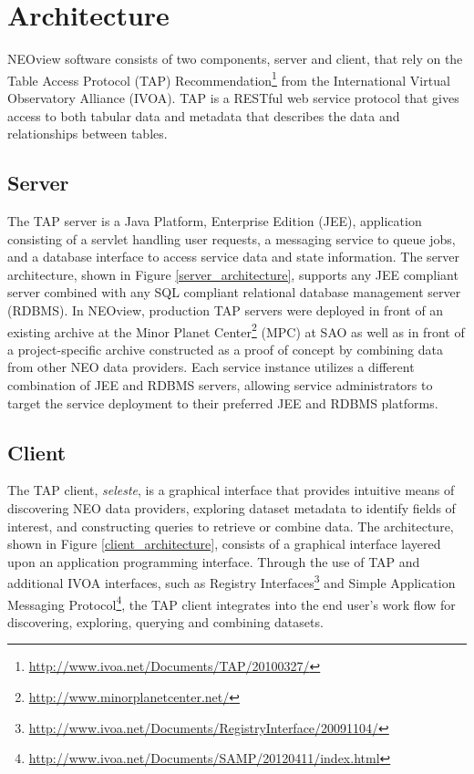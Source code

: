 \documentclass[11pt,twoside]{article}
\begin{document}
\section{Architecture}
NEOview software consists of two components, server and client, that rely on the Table Access Protocol (TAP) Recommendation\footnote{\url{http://www.ivoa.net/Documents/TAP/20100327/}} from the International Virtual Observatory Alliance (IVOA).  TAP is a RESTful web service protocol that gives access to both tabular data and metadata that describes the data and relationships between tables.

\subsection{Server}
The TAP server is a Java Platform, Enterprise Edition (JEE), application consisting of a servlet handling user requests, a messaging service to queue jobs, and a database interface to access service data and state information.  The server architecture, shown in Figure \ref{server_architecture}, supports any JEE compliant server combined with any SQL compliant relational database management server (RDBMS).  In NEOview, production TAP servers were deployed in front of an existing archive at the Minor Planet Center\footnote{\url{http://www.minorplanetcenter.net/}} (MPC) at SAO as well as in front of a project-specific archive constructed as a proof of concept by combining data from other NEO data providers.  Each service instance utilizes a different combination of JEE and RDBMS servers, allowing service administrators to target the service deployment to their preferred JEE and RDBMS platforms.


\subsection{Client}
The TAP client, \textit{seleste}, is a graphical interface that provides intuitive means of discovering NEO data providers, exploring dataset metadata to identify fields of interest, and constructing queries to retrieve or combine data.  The architecture, shown in Figure \ref{client_architecture}, consists of a graphical interface layered upon an application programming interface.  Through the use of TAP and additional IVOA interfaces, such as Registry Interfaces\footnote{\url{http://www.ivoa.net/Documents/RegistryInterface/20091104/}} and Simple Application Messaging Protocol\footnote{\url{http://www.ivoa.net/Documents/SAMP/20120411/index.html}}, the TAP client integrates into the end user's work flow for discovering, exploring, querying and combining datasets.
\end{document}
